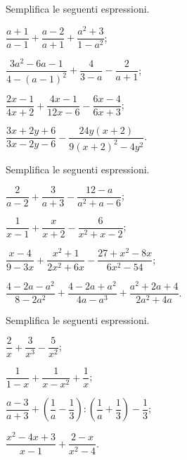 \begin{esercizio}[\Ast]
\label{ese:14.29}
Semplifica le seguenti espressioni.
\begin{multicols}{2}
\begin{enumeratea}
 \item $\dfrac{a+1}{a-1}+\dfrac{a-2}{a+1}+\dfrac{a^{2}+3}{1-a^{2}}$;
 \item $\dfrac{3a^{2}-6a-1}{4-(a-1)^{2}}+\dfrac{4}{3-a}-\dfrac{2}{a+1}$;
 \item $\dfrac{2x-1}{4x+2}+\dfrac{4x-1}{12x-6}-\dfrac{6x-4}{6x+3}$;
 \item $\dfrac{3x+2y+6}{3x-2y-6}-\dfrac{24y(x+2)}{9(x+2)^{2}-4y^{2}}$.
\end{enumeratea}
\end{multicols}
\end{esercizio}

\begin{esercizio}[\Ast]
\label{ese:14.30}
Semplifica le seguenti espressioni.
\begin{enumeratea}
 \item $\dfrac{2}{a-2}+\dfrac{3}{a+3}-\dfrac{12-a}{a^{2}+a-6}$;
 \item $\dfrac{1}{x-1}+\dfrac{x}{x+2}-\dfrac{6}{x^{2}+x-2}$;
 \item $\dfrac{x-4}{9-3x}+\dfrac{x^{2}+1}{2x^{2}+6x}-\dfrac{27+x^{2}-8x}{6x^{2}-54}$;
 \item $\dfrac{4-2a-a^{2}}{8-2a^{2}}+\dfrac{4-2a+a^{2}}{4a-a^{3}}+\dfrac{a^{2}+2a+4}{2a^{2}+4a}$.
\end{enumeratea}
\end{esercizio}

\begin{esercizio}[\Ast]
\label{ese:14.31}
Semplifica le seguenti espressioni.
\begin{multicols}{2}
\begin{enumeratea}
 \item $\dfrac{2}{x}+\dfrac{3}{x^{3}}-\dfrac{5}{x^{2}}$;
 \item $\dfrac{1}{1-x}+\dfrac{1}{x-x^{2}}+\dfrac{1}{x}$;
 \item $\dfrac{a-3}{a+3}+\left(\dfrac{1}{a}-\dfrac{1}{3}\right):\left(\dfrac{1}{a}+\dfrac{1}{3}\right)-\dfrac{1}{3}$;
 \item $\dfrac{x^{2}-4x+3}{x-1}+\dfrac{2-x}{x^{2}-4}$.
\end{enumeratea}
\end{multicols}
\end{esercizio}

